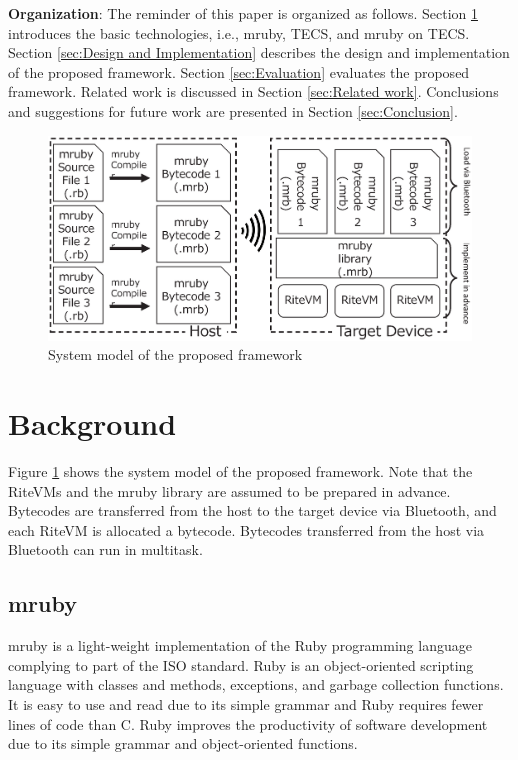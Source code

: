 \documentclass[S,R,E]{article/compsoft}
\begin{document}
{\bf Organization}: The reminder of this paper is organized as follows.
Section \ref{sec:Background} introduces the basic technologies, i.e., mruby, TECS, and mruby on TECS.
Section \ref{sec:Design and Implementation} describes the design and implementation of the proposed framework.
Section \ref{sec:Evaluation} evaluates the proposed framework.
Related work is discussed in Section \ref{sec:Related work}.
Conclusions and suggestions for future work are presented in Section \ref{sec:Conclusion}.


\begin{figure}[t]
    \centering
    \includegraphics[width=14cm,clip]{figure/proposed.eps}
    \caption{System model of the proposed framework}
    \label{fig:proposed}
\end{figure}

\section{Background}
\label{sec:Background}
Figure \ref{fig:proposed} shows the system model of the proposed framework.
Note that the RiteVMs and the mruby library are assumed to be prepared in advance.
Bytecodes are transferred from the host to the target device via Bluetooth, and each RiteVM is allocated a bytecode.
Bytecodes transferred from the host via Bluetooth can run in multitask.

\subsection{mruby}
\label{sec:mruby}
mruby is a light-weight implementation of the Ruby programming language complying to part of the ISO standard.
Ruby is an object-oriented scripting language \cite{url:Ruby} with classes and methods, exceptions, and garbage collection functions.
It is easy to use and read due to its simple grammar and Ruby requires fewer lines of code than C.
Ruby improves the productivity of software development due to its simple grammar and object-oriented functions.
\end{document}
